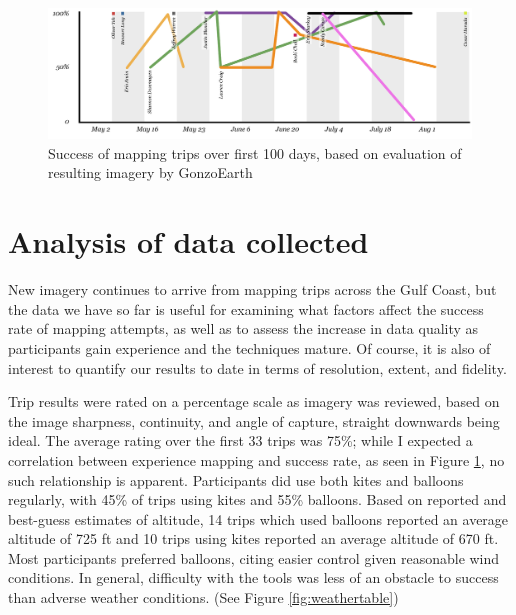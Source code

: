 \documentclass[11pt,oneside,notitlepage]{report}
\begin{document}
\begin{figure}[h]
  \label{fig:successmapping}
  \begin{center}
	\includegraphics[width=1\textwidth]{diagrams/trip-success-leaders.pdf}
	\caption{Success of mapping trips over first 100 days, based on evaluation of resulting imagery by GonzoEarth}
  \end{center}
\end{figure}

\section{Analysis of data collected}

New imagery continues to arrive from mapping trips across the Gulf Coast, but the data we have so far is useful for examining what factors affect the success rate of mapping attempts, as well as to assess the increase in data quality as participants gain experience and the techniques mature. Of course, it is also of interest to quantify our results to date in terms of resolution, extent, and fidelity.  

Trip results were rated on a percentage scale as imagery was reviewed, based on the image sharpness, continuity, and angle of capture, straight downwards being ideal. The average rating over the first 33 trips was 75\%; while I expected a correlation between experience mapping and success rate, as seen in Figure \ref{fig:successmapping}, no such relationship is apparent. Participants did use both kites and balloons regularly, with 45\% of trips using kites and 55\% balloons. Based on reported and best-guess estimates of altitude, 14 trips which used balloons reported an average altitude of 725 ft and 10 trips using kites reported an average altitude of 670 ft. Most participants preferred balloons, citing easier control given reasonable wind conditions. In general, difficulty with the tools was less of an obstacle to success than adverse weather conditions. (See Figure \ref{fig:weathertable}) 
\end{document}
